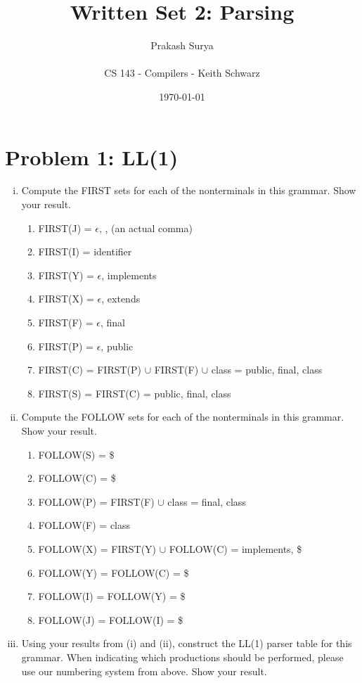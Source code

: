 \documentclass{article}
\title{Written Set 2: Parsing}
\author{Prakash Surya\\\\CS 143 - Compilers - Keith Schwarz}
\date{\today}
\begin{document}
\maketitle

\section{Problem 1: LL(1)}

\begin{enumerate}[i.]
	\item Compute the FIRST sets for each of the nonterminals in this
		grammar. Show your result.
		\begin{enumerate}
			\item FIRST(J) = $\epsilon$, , (an actual comma)
			\item FIRST(I) = identifier
			\item FIRST(Y) = $\epsilon$, implements
			\item FIRST(X) = $\epsilon$, extends
			\item FIRST(F) = $\epsilon$, final
			\item FIRST(P) = $\epsilon$, public
			\item FIRST(C) = FIRST(P) $\cup$ FIRST(F) $\cup$ class
			               = public, final, class
			\item FIRST(S) = FIRST(C) = public, final, class
		\end{enumerate}
	\item Compute the FOLLOW sets for each of the nonterminals in this
		grammar. Show your result.
		\begin{enumerate}
			\item FOLLOW(S) = \$
			\item FOLLOW(C) = \$
			\item FOLLOW(P) = FIRST(F) $\cup$ class
			                = final, class
			\item FOLLOW(F) = class
			\item FOLLOW(X) = FIRST(Y) $\cup$ FOLLOW(C)
			                = implements, \$
			\item FOLLOW(Y) = FOLLOW(C) = \$
			\item FOLLOW(I) = FOLLOW(Y) = \$
			\item FOLLOW(J) = FOLLOW(I) = \$
		\end{enumerate}
	\item Using your results from (i) and (ii), construct the LL(1) parser
		table for this grammar. When indicating which productions should
		be performed, please use our numbering system from above. Show
		your result.


\end{enumerate}
\end{document}
